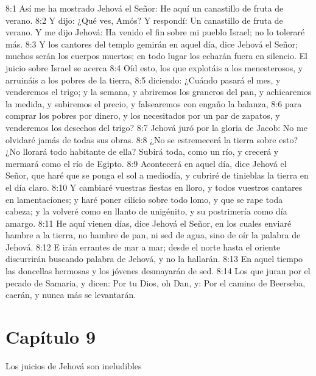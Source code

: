 8:1 Así me ha mostrado Jehová el Señor: He aquí un canastillo de fruta de verano.   
8:2 Y dijo: ¿Qué ves, Amós? Y respondí: Un canastillo de fruta de verano. Y me dijo Jehová: Ha venido el fin sobre mi pueblo Israel; no lo toleraré más.   
8:3 Y los cantores del templo gemirán en aquel día, dice Jehová el Señor; muchos serán los cuerpos muertos; en todo lugar los echarán fuera en silencio.   
El juicio sobre Israel se acerca   
8:4 Oíd esto, los que explotáis a los menesterosos, y arruináis a los pobres de la tierra,   
8:5 diciendo: ¿Cuándo pasará el mes, y venderemos el trigo; y la semana, y abriremos los graneros del pan, y achicaremos la medida, y subiremos el precio, y falsearemos con engaño la balanza,   
8:6 para comprar los pobres por dinero, y los necesitados por un par de zapatos, y venderemos los desechos del trigo?   
8:7 Jehová juró por la gloria de Jacob: No me olvidaré jamás de todas sus obras.   
8:8 ¿No se estremecerá la tierra sobre esto? ¿No llorará todo habitante de ella? Subirá toda, como un río, y crecerá y mermará como el río de Egipto.   
8:9 Acontecerá en aquel día, dice Jehová el Señor, que haré que se ponga el sol a mediodía, y cubriré de tinieblas la tierra en el día claro.   
8:10 Y cambiaré vuestras fiestas en lloro, y todos vuestros cantares en lamentaciones; y haré poner cilicio sobre todo lomo, y que se rape toda cabeza; y la volveré como en llanto de unigénito, y su postrimería como día amargo.   
8:11 He aquí vienen días, dice Jehová el Señor, en los cuales enviaré hambre a la tierra, no hambre de pan, ni sed de agua, sino de oír la palabra de Jehová.   
8:12 E irán errantes de mar a mar; desde el norte hasta el oriente discurrirán buscando palabra de Jehová, y no la hallarán.   
8:13 En aquel tiempo las doncellas hermosas y los jóvenes desmayarán de sed.   
8:14 Los que juran por el pecado de Samaria, y dicen: Por tu Dios, oh Dan, y: Por el camino de Beerseba, caerán, y nunca más se levantarán.   
\section*{Capítulo 9 }
Los juicios de Jehová son ineludibles   
  
